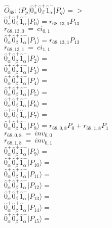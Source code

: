 \documentclass[14pt]{article}
\begin{document}
    $\hat{O}_{68}:  \langle{P_p}\vert \hat{0}_{\alpha}^{+}\hat{0}_{\beta}^{+}\hat{1}_{\alpha}^{-} \vert{P_q}\rangle => $ \\ 
    $ \hat{0}_{\alpha}^{+}\hat{0}_{\beta}^{+}\hat{1}_{\alpha}^{-} \vert{P_{0}}\rangle = {r}_{68,13,0}P_{13} $ \\ 
    ${r}_{68,13,0}\ =\ {ci}_{0,1} $ \\ 
    $ \hat{0}_{\alpha}^{+}\hat{0}_{\beta}^{+}\hat{1}_{\alpha}^{-} \vert{P_{1}}\rangle = {r}_{68,13,1}P_{13} $ \\ 
    ${r}_{68,13,1}\ =\ {ci}_{1,1} $ \\ 
    $ \hat{0}_{\alpha}^{+}\hat{0}_{\beta}^{+}\hat{1}_{\alpha}^{-} \vert{P_{2}}\rangle =  $ \\ 
    $ \hat{0}_{\alpha}^{+}\hat{0}_{\beta}^{+}\hat{1}_{\alpha}^{-} \vert{P_{3}}\rangle =  $ \\ 
    $ \hat{0}_{\alpha}^{+}\hat{0}_{\beta}^{+}\hat{1}_{\alpha}^{-} \vert{P_{4}}\rangle =  $ \\ 
    $ \hat{0}_{\alpha}^{+}\hat{0}_{\beta}^{+}\hat{1}_{\alpha}^{-} \vert{P_{5}}\rangle =  $ \\ 
    $ \hat{0}_{\alpha}^{+}\hat{0}_{\beta}^{+}\hat{1}_{\alpha}^{-} \vert{P_{6}}\rangle =  $ \\ 
    $ \hat{0}_{\alpha}^{+}\hat{0}_{\beta}^{+}\hat{1}_{\alpha}^{-} \vert{P_{7}}\rangle =  $ \\ 
    $ \hat{0}_{\alpha}^{+}\hat{0}_{\beta}^{+}\hat{1}_{\alpha}^{-} \vert{P_{8}}\rangle = {r}_{68,0,8}P_{0}+{r}_{68,1,8}P_{1} $ \\ 
    ${r}_{68,0,8}\ =\ {inv}_{0,0} $ \\ 
    ${r}_{68,1,8}\ =\ {inv}_{0,1} $ \\ 
    $ \hat{0}_{\alpha}^{+}\hat{0}_{\beta}^{+}\hat{1}_{\alpha}^{-} \vert{P_{9}}\rangle =  $ \\ 
    $ \hat{0}_{\alpha}^{+}\hat{0}_{\beta}^{+}\hat{1}_{\alpha}^{-} \vert{P_{10}}\rangle =  $ \\ 
    $ \hat{0}_{\alpha}^{+}\hat{0}_{\beta}^{+}\hat{1}_{\alpha}^{-} \vert{P_{11}}\rangle =  $ \\ 
    $ \hat{0}_{\alpha}^{+}\hat{0}_{\beta}^{+}\hat{1}_{\alpha}^{-} \vert{P_{12}}\rangle =  $ \\ 
    $ \hat{0}_{\alpha}^{+}\hat{0}_{\beta}^{+}\hat{1}_{\alpha}^{-} \vert{P_{13}}\rangle =  $ \\ 
    $ \hat{0}_{\alpha}^{+}\hat{0}_{\beta}^{+}\hat{1}_{\alpha}^{-} \vert{P_{14}}\rangle =  $ \\ 
    $ \hat{0}_{\alpha}^{+}\hat{0}_{\beta}^{+}\hat{1}_{\alpha}^{-} \vert{P_{15}}\rangle =  $ \\ 
    
\end{document}
